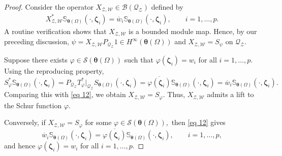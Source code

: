 \documentclass[12pt,reqno]{amsart}
\theoremstyle{remark}
\theoremstyle{definition}
\newcommand{\beq}{\begin{eqnarray}}
\newcommand{\eeq}{\end{eqnarray}}
\begin{document}
\begin{proof}
    Consider the operator $X_{\mathcal{Z,W}}\in \mathcal{B}(\mathcal{Q}_{\mathcal{Z}})$ defined by \beq \label{eq 12} X_{\mathcal{Z,W}}^* \mathbb S_{\boldsymbol \theta(\Omega)}(\cdot, \boldsymbol \zeta_i)=\overline{w}_i \mathbb S_{\boldsymbol \theta(\Omega)}(\cdot, \boldsymbol \zeta_i),\qquad i=1,\ldots,p.\eeq 
    A routine verification shows that $X_{\mathcal{Z},\mathcal{W}}$ is a bounded module map. Hence, by our preceding discussion, $\psi=X_{\mathcal{Z,W}}P_{\mathcal{Q}_{\mathcal{Z}}}1\in H^\infty(\boldsymbol \theta(\Omega))$ and $X_{\mathcal{Z,W}}=S_{\psi}$ on $\mathcal{Q}_{\mathcal{Z}}.$

    Suppose there exists $\varphi\in \mathcal{S}(\boldsymbol \theta(\Omega))$ such that $\varphi(\boldsymbol{\zeta}_i) = w_i$ for all $i = 1, \ldots, p$. Using the reproducing property,
    $$S_{\varphi}^* \mathbb S_{\boldsymbol \theta(\Omega)}(\cdot, \boldsymbol \zeta_i)=P_{\mathcal{Q}_{\mathcal{Z}}} T_{\varphi}^*|_{\mathcal{Q}_{\mathcal{Z}}} S_{\boldsymbol \theta(\Omega)}(\cdot, \boldsymbol \zeta_i) = \overline{\varphi(\boldsymbol \zeta_i)}\mathbb S_{\boldsymbol \theta(\Omega)}(\cdot, \boldsymbol \zeta_i)=\overline{w}_i \mathbb S_{\boldsymbol \theta(\Omega)}(\cdot, \boldsymbol \zeta_i).$$ 
    Comparing this with \eqref{eq 12}, we obtain $X_{\mathcal{Z,W}}=S_{\varphi}.$ Thus, $X_{\mathcal{Z},\mathcal{W}}$ admits a lift to the Schur function $\varphi.$
    
    Conversely, if $X_{\mathcal{Z,W}}=S_{\varphi}$ for some $\varphi\in \mathcal{S}(\boldsymbol \theta(\Omega)),$ then \eqref{eq 12} gives
    $$\overline{w}_i \mathbb S_{\boldsymbol \theta(\Omega)}(\cdot, \boldsymbol \zeta_i)=\overline{\varphi(\boldsymbol \zeta_i)} \mathbb S_{\boldsymbol \theta(\Omega)}(\cdot,\boldsymbol \zeta_i), \qquad i=1,\ldots,p,$$ and hence  $\varphi(\boldsymbol \zeta_i)=w_i$ for all $i=1,\ldots,p.$


\end{proof}
\end{document}
